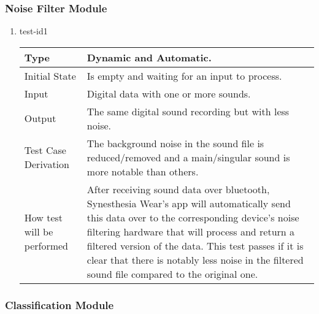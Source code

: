 \documentclass[12pt, titlepage]{article}
\begin{document}
\subsubsection{Noise Filter Module}

\begin{enumerate}

\item{test-id1\\}

\begin{tabular}{ |p{5cm}||p{7cm}| }
    \hline
    Type & Dynamic and Automatic. \\
    \hline
    Initial State  &  Is empty and waiting for an input to process. \\
    \hline
    Input &   Digital data with one or more sounds. \\
    \hline
    Output &   The same digital sound recording but with less noise.  \\
    \hline
    Test Case Derivation &   The background noise in the sound file is reduced/removed and a main/singular sound is more notable than others. \\
    \hline
    How test will be performed & After receiving sound data over bluetooth, Synesthesia Wear’s app will automatically send this data over to the corresponding device’s noise filtering hardware that will process and return a filtered version of the data. This test passes if it is clear that there is notably less noise in the filtered sound file compared to the original one. \\
    \hline
\end{tabular}

\end{enumerate}


\subsubsection{Classification Module}
\end{document}
